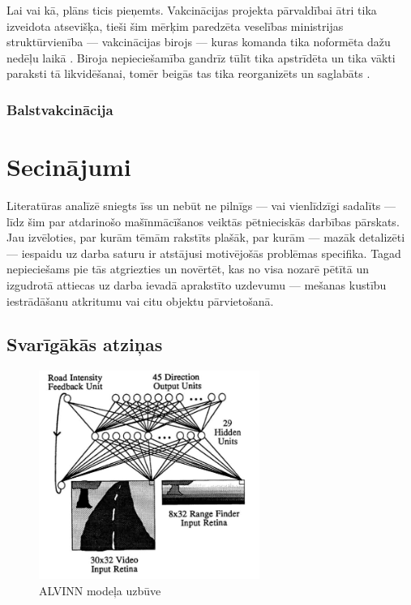 \documentclass[12pt, a4paper]{article}
\numberwithin{equation}{section} %
\begin{document}
Lai vai kā, plāns ticis pieņemts. Vakcinācijas projekta pārvaldībai ātri tika izveidota atsevišķa, tieši šim mērķim paredzēta veselības ministrijas struktūrvienība --- vakcinācijas birojs \cite{vaxx_bureau_proposed} --- kuras komanda tika noformēta dažu nedēļu laikā \cite{vaxx_bureau_leadership}. Biroja nepieciešamība gandrīz tūlīt tika apstrīdēta un tika vākti paraksti tā likvidēšanai, tomēr beigās tas tika reorganizēts un saglabāts \cite{vaxx_bureau_reorganized}.


\subsubsection{Balstvakcinācija}


\newpage
\section{Secinājumi}

Literatūras analīzē sniegts īss un nebūt ne pilnīgs --- vai vienlīdzīgi sadalīts --- līdz šim par atdarinošo mašīnmācīšanos veiktās pētnieciskās darbības pārskats. Jau izvēloties, par kurām tēmām rakstīts plašāk, par kurām --- mazāk detalizēti --- iespaidu uz darba saturu ir atstājusi motivējošās problēmas specifika. Tagad nepieciešams pie tās atgriezties un novērtēt, kas no visa nozarē pētītā un izgudrotā attiecas uz darba ievadā aprakstīto uzdevumu --- mešanas kustību iestrādāšanu atkritumu vai citu objektu pārvietošanā.

\subsection{Svarīgākās atziņas}

\begin{figure}[t!]
    \centering
    \includegraphics[height=6.8cm,page=1]{../img/alvinn_architecture.png}
    \caption{ALVINN modeļa uzbūve}
\end{figure}

\newpage
{}
\printbibliography[title=Atsauces]
\end{document}
